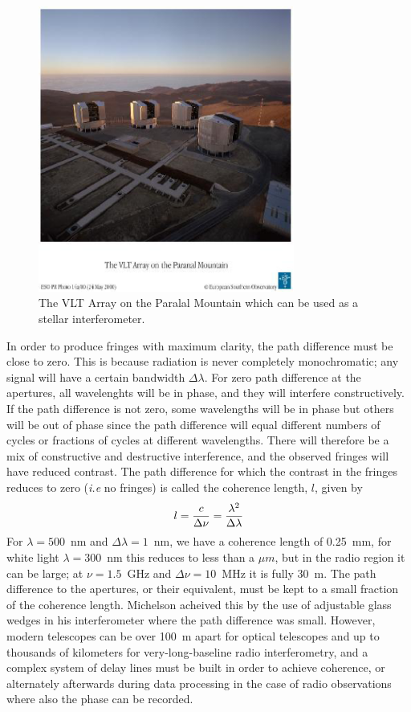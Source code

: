 \begin{figure}[h]
  \centering
	\includegraphics[width=0.75\textwidth]{vlt-image-smallsize.eps}
  \caption{The VLT Array on the Paralal Mountain which can be used as a stellar interferometer.}
  \label{fig:vlt-array}
\end{figure}

In order to produce fringes with maximum clarity, the path difference must be close to zero. This is because radiation is never completely monochromatic; any signal will have a certain bandwidth $\Delta\lambda$. For zero path difference at the apertures, all wavelenghts will be in phase, and they will interfere constructively. If the path difference is not zero, some wavelengths will be in phase but others will be out of phase since the path difference will equal different numbers of cycles or fractions of cycles at different wavelengths. There will therefore be a mix of constructive and destructive interference, and the observed fringes will have reduced contrast. The path difference for which the contrast in the fringes reduces to zero ({\it i.e} no fringes) is called the coherence length, $l$, given by
\[
l={c\over\Delta\nu}={\lambda^2\over\Delta\lambda}
\]
\noindent
For $\lambda=500$~nm and $\Delta\lambda=1$~nm, we have a coherence length of
0.25~mm, for white light $\lambda=300$~nm this reduces to less than a $\mu m$, but in the radio region it can be large; at $\nu=1.5$~GHz and $\Delta\nu=10$~MHz it is fully 30~m. The path difference to the apertures, or their equivalent, must be kept to a small fraction of the coherence length. Michelson acheived this by the use of adjustable glass wedges in his interferometer where the path difference was small. However, modern telescopes can be over 100~m apart for optical telescopes and up to thousands of kilometers for very-long-baseline radio interferometry, and a complex system of delay lines must be built in order to achieve coherence, or alternately afterwards during data processing in the case of radio observations where also the phase can be recorded.

